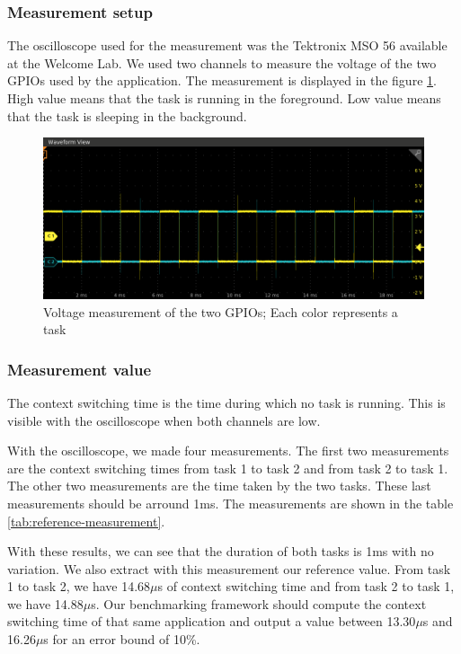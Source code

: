 \subsubsection{Measurement setup}

The oscilloscope used for the measurement was the Tektronix MSO 56 available at the Welcome Lab.
We used two channels to measure the voltage of the two GPIOs used by the application.
The measurement is displayed in the figure \ref{fig:measurement-value-wave}.
High value means that the task is running in the foreground.
Low value means that the task is sleeping in the background.

\begin{figure}[!ht]
  \centering
  \includegraphics[scale=0.5]{assets/measurement-value-wave.png}
  \caption{\label{fig:measurement-value-wave}Voltage measurement of the two GPIOs; Each color represents a task}
\end{figure}

\subsubsection{Measurement value}

The context switching time is the time during which no task is running.
This is visible with the oscilloscope when both channels are low.

With the oscilloscope, we made four measurements.
The first two measurements are the context switching times from task 1 to task 2 and from task 2 to task 1.
The other two measurements are the time taken by the two tasks.
These last measurements should be arround 1ms.
The measurements are shown in the table \ref{tab:reference-measurement}.

With these results, we can see that the duration of both tasks is 1ms with no variation.
We also extract with this measurement our reference value.
From task 1 to task 2, we have 14.68$\mu$s of context switching time and from task 2 to task 1, we have 14.88$\mu$s.
Our benchmarking framework should compute the context switching time of that same application and output a value between 13.30$\mu$s and 16.26$\mu$s for an error bound of 10\%.

